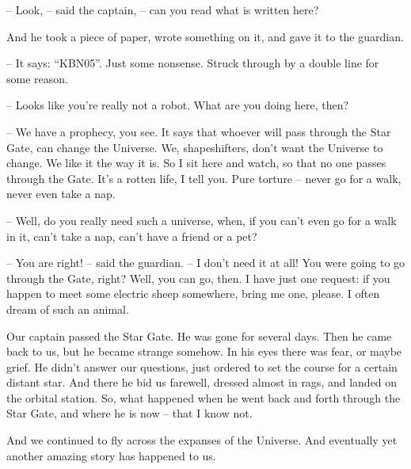 \documentclass[ebook,oneside,final,openright]{memoir}
\begin{document}
– Look, – said the captain, – can you read what is written here?\par
And he took a piece of paper, wrote something on it, and gave it to the guardian.\par
– It says: “KBN05”. Just some nonsense. Struck through by a double line for some reason.\par
– Looks like you’re really not a robot. What are you doing here, then?\par
– We have a prophecy, you see. It says that whoever will pass through the Star Gate, can change the Universe. We, shapeshifters, don’t want the Universe to change. We like it the way it is. So I sit here and watch, so that no one passes through the Gate. It’s a rotten life, I tell you. Pure torture – never go for a walk, never even take a nap.\par
– Well, do you really need such a universe, when, if you can’t even go for a walk in it, can’t take a nap, can’t have a friend or a pet?\par
– You are right! – said the guardian. – I don’t need it at all! You were going to go through the Gate, right? Well, you can go, then. I have just one request: if you happen to meet some electric sheep somewhere, bring me one, please. I often dream of such an animal.\par
Our captain passed the Star Gate. He was gone for several days. Then he came back to us, but he became strange somehow. In his eyes there was fear, or maybe grief. He didn’t answer our questions, just ordered to set the course for a certain distant star. And there he bid us farewell, dressed almost in rags, and landed on the orbital station. So, what happened when he went back and forth through the Star Gate, and where he is now – that I know not. \par
\par
 And we continued to fly across the expanses of the Universe. And eventually yet another amazing story has happened to us.
\end{document}
